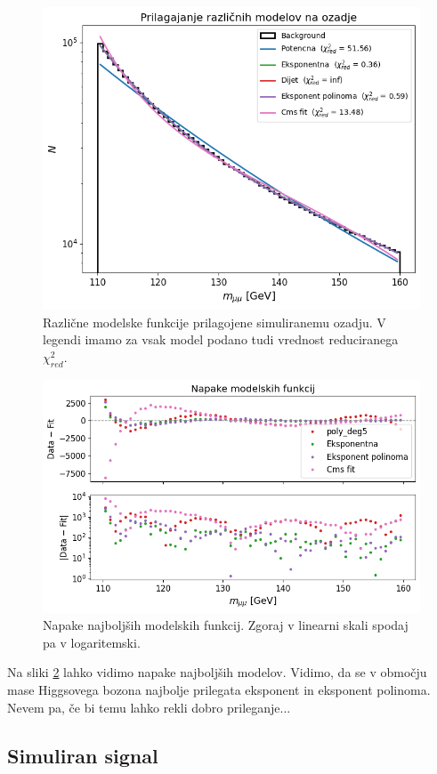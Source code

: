\documentclass[slovene,11pt,a4paper]{article}
\begin{document}
\begin{figure}[h!]
    \centering
    \includegraphics[width=0.8\linewidth]{imgs/modeli.png}
    \caption{Različne modelske funkcije prilagojene simuliranemu ozadju. V legendi imamo za vsak model podano tudi vrednost reduciranega $\chi^2_{red}$.}
    \label{fig:modeli}
\end{figure}

\begin{figure}[h!]
    \centering
    \includegraphics[width=0.8\linewidth]{imgs/najboljsi_modeli.png}
    \caption{Napake najboljših modelskih funkcij. Zgoraj v linearni skali spodaj pa v logaritemski.}
    \label{fig:najboljsi_modeli}
\end{figure}

Na sliki \ref{fig:najboljsi_modeli} lahko vidimo napake najboljših modelov. Vidimo, da se v območju mase Higgsovega bozona najbolje prilegata eksponent in eksponent polinoma. Nevem pa, če bi temu lahko rekli dobro prileganje... 

\subsection{Simuliran signal}
\end{document}
